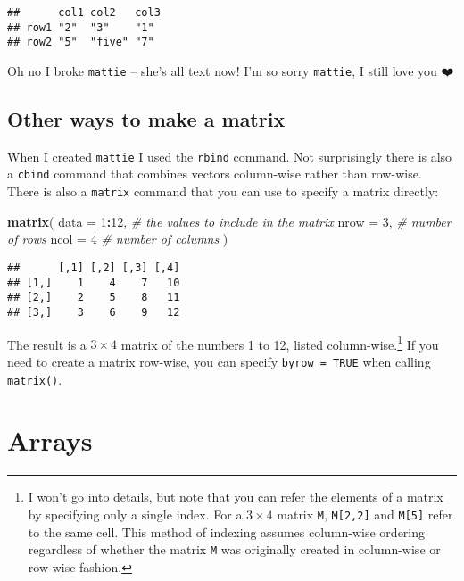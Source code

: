 \documentclass[]{book}
\newenvironment{Shaded}{\begin{snugshade}}{\end{snugshade}}
\newcommand{\CommentTok}[1]{\textcolor[rgb]{0.56,0.35,0.01}{\textit{#1}}}
\newcommand{\DataTypeTok}[1]{\textcolor[rgb]{0.13,0.29,0.53}{#1}}
\newcommand{\DecValTok}[1]{\textcolor[rgb]{0.00,0.00,0.81}{#1}}
\newcommand{\KeywordTok}[1]{\textcolor[rgb]{0.13,0.29,0.53}{\textbf{#1}}}
\newcommand{\NormalTok}[1]{#1}
\newcommand{\OperatorTok}[1]{\textcolor[rgb]{0.81,0.36,0.00}{\textbf{#1}}}
\let\rmarkdownfootnote\footnote%
\def\footnote{\protect\rmarkdownfootnote}
\begin{document}
\begin{verbatim}
##      col1 col2   col3
## row1 "2"  "3"    "1" 
## row2 "5"  "five" "7"
\end{verbatim}

Oh no I broke \texttt{mattie} -- she's all text now! I'm so sorry \texttt{mattie}, I still love you ❤️

\hypertarget{other-ways-to-make-a-matrix}{%
\subsection{Other ways to make a matrix}\label{other-ways-to-make-a-matrix}}

When I created \texttt{mattie} I used the \texttt{rbind} command. Not surprisingly there is also a \texttt{cbind} command that combines vectors column-wise rather than row-wise. There is also a \texttt{matrix} command that you can use to specify a matrix directly:

\begin{Shaded}
\begin{Highlighting}[]
\KeywordTok{matrix}\NormalTok{(}
  \DataTypeTok{data =} \DecValTok{1}\OperatorTok{:}\DecValTok{12}\NormalTok{, }\CommentTok{# the values to include in the matrix}
  \DataTypeTok{nrow =} \DecValTok{3}\NormalTok{,    }\CommentTok{# number of rows}
  \DataTypeTok{ncol =} \DecValTok{4}     \CommentTok{# number of columns}
\NormalTok{)}
\end{Highlighting}
\end{Shaded}

\begin{verbatim}
##      [,1] [,2] [,3] [,4]
## [1,]    1    4    7   10
## [2,]    2    5    8   11
## [3,]    3    6    9   12
\end{verbatim}

The result is a \(3\times 4\) matrix of the numbers 1 to 12, listed column-wise.\footnote{I won't go into details, but note that you can refer the elements of a matrix by specifying only a single index. For a \(3\times 4\) matrix \texttt{M}, \texttt{M{[}2,2{]}} and \texttt{M{[}5{]}} refer to the same cell. This method of indexing assumes column-wise ordering regardless of whether the matrix \texttt{M} was originally created in column-wise or row-wise fashion.} If you need to create a matrix row-wise, you can specify \texttt{byrow\ =\ TRUE} when calling \texttt{matrix()}.

\hypertarget{arrays}{%
\section{Arrays}\label{arrays}}
\end{document}
